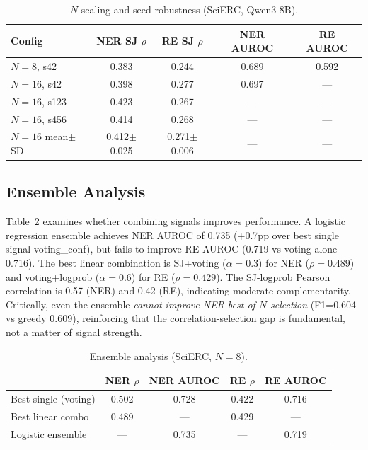 \documentclass[11pt,a4paper]{article}
\begin{document}
\begin{table}[t]
\centering
\small
\caption{$N$-scaling and seed robustness (SciERC, Qwen3-8B).}
\label{tab:nscaling}
\begin{tabular}{l cc cc}
\toprule
Config & NER SJ $\rho$ & RE SJ $\rho$ & NER AUROC & RE AUROC \\
\midrule
$N{=}8$, s42       & 0.383 & 0.244 & 0.689 & 0.592 \\
$N{=}16$, s42      & 0.398 & 0.277 & 0.697 & --- \\
$N{=}16$, s123     & 0.423 & 0.267 & --- & --- \\
$N{=}16$, s456     & 0.414 & 0.268 & --- & --- \\
\midrule
$N{=}16$ mean$\pm$SD & 0.412$\pm$0.025 & 0.271$\pm$0.006 & --- & --- \\
\bottomrule
\end{tabular}
\end{table}

\subsection{Ensemble Analysis}
\label{sec:ensemble}

Table~\ref{tab:ensemble} examines whether combining signals improves performance.
A logistic regression ensemble achieves NER AUROC of 0.735 (+0.7pp over best single signal voting\_conf), but fails to improve RE AUROC (0.719 vs voting alone 0.716).
The best linear combination is SJ+voting ($\alpha{=}0.3$) for NER ($\rho{=}0.489$) and voting+logprob ($\alpha{=}0.6$) for RE ($\rho{=}0.429$).
The SJ-logprob Pearson correlation is 0.57 (NER) and 0.42 (RE), indicating moderate complementarity.
Critically, even the ensemble \emph{cannot improve NER best-of-$N$ selection} (F1=0.604 vs greedy 0.609), reinforcing that the correlation-selection gap is fundamental, not a matter of signal strength.

\begin{table}[t]
\centering
\small
\caption{Ensemble analysis (SciERC, $N{=}8$).}
\label{tab:ensemble}
\begin{tabular}{l cc cc}
\toprule
& NER $\rho$ & NER AUROC & RE $\rho$ & RE AUROC \\
\midrule
Best single (voting) & 0.502 & 0.728 & 0.422 & 0.716 \\
Best linear combo    & 0.489 & --- & 0.429 & --- \\
Logistic ensemble    & --- & 0.735 & --- & 0.719 \\
\bottomrule
\end{tabular}
\end{table}
\end{document}
